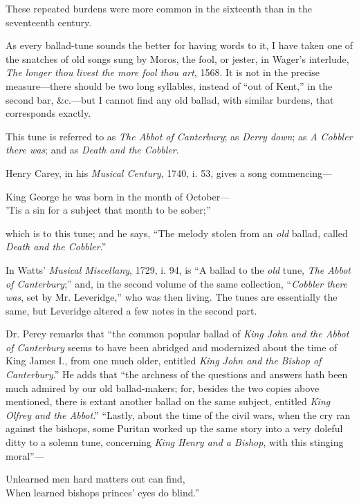 These repeated burdens were more common in the sixteenth than in the
seventeenth century.

As every ballad-tune sounds the better for having words to it, I have taken one 
of the snatches of old songs sung by \pagebreak Moros, the fool, or jester, in Wager’s
interlude, \textit{The longer thou livest the more fool thou art}, 1568. It is not in the
precise measure—there should be two long syllables, instead of “out of Kent,”
in the second bar, \&c.—but I cannot find any old ballad, with similar burdens,
that corresponds exactly.




This tune is referred to as \textit{The Abbot of Canterbury}; as \textit{Derry down}; as
\textit{A Cobbler there was}; and as \textit{Death and the Cobbler}.

Henry Carey, in his \textit{Musical Century}, 1740, i. 53, gives a song commencing—
\settowidth{\versewidth}{King George he was born in the month of October—}
\begin{scverse}
King George he was born in the month of October—\\
’Tis a sin for a subject that month to be sober;”
\end{scverse}
which is to this tune; and he says, “The melody stolen from an \textit{old} ballad,
called \textit{Death and the Cobbler}.”

In Watts’ \textit{Musical Miscellany}, 1729, i. 94, is “A ballad to the \textit{old} tune, \textit{The
Abbot of Canterbury};” and, in the second volume of the same collection,
“\textit{Cobbler there was}, set by Mr. Leveridge,” who was then living. The tunes
are essentially the same, but Leveridge altered a few notes in the second part.

Dr. Percy remarks that “the common popular \pagebreak ballad of \textit{King John and the
Abbot of Canterbury} seems to have been abridged and modernized about the time
of King James I., from one much older, entitled \textit{King John and the Bishop of
Canterbury}.” He adds that “the archness of the questions and answers hath
been much admired by our old ballad-makers; for, besides the two copies above
mentioned, there is extant another ballad on the same subject, entitled \textit{King
Olfrey and the Abbot}.” “Lastly, about the time of the civil wars, when the cry
ran against the bishops, some Puritan worked up the same story into a very
doleful ditty to a solemn tune, concerning \textit{King Henry and a Bishop}, with this
stinging moral”—
\settowidth{\versewidth}{Unlearned men hard matters out can find,}
\begin{scverse}
Unlearned men hard matters out can find,\\
When learned bishops princes’ eyes do blind.”
\end{scverse}

